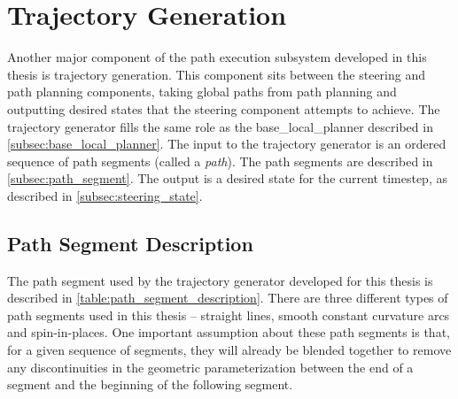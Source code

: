 \section{Trajectory Generation}\label{sec:trajectory_generation}

Another major component of the path execution subsystem developed in this thesis is trajectory generation. This component sits between the steering and path planning components, taking global paths from path planning and outputting desired states that the steering component attempts to achieve. The trajectory generator fills the same role as the base\_local\_planner described in \autoref{subsec:base_local_planner}. The input to the trajectory generator is an ordered sequence of path segments (called a \emph{path}). The path segments are described in \autoref{subsec:path_segment}. The output is a desired state for the current timestep, as described in \autoref{subsec:steering_state}.

\subsection{Path Segment Description}\label{subsec:path_segment}

The path segment used by the trajectory generator developed for this thesis is described in \autoref{table:path_segment_description}. There are three different types of path segments used in this thesis -- straight lines, smooth constant curvature arcs and spin-in-places. One important assumption about these path segments is that, for a given sequence of segments, they will already be blended together to remove any discontinuities in the geometric parameterization between the end of a segment and the beginning of the following segment.

